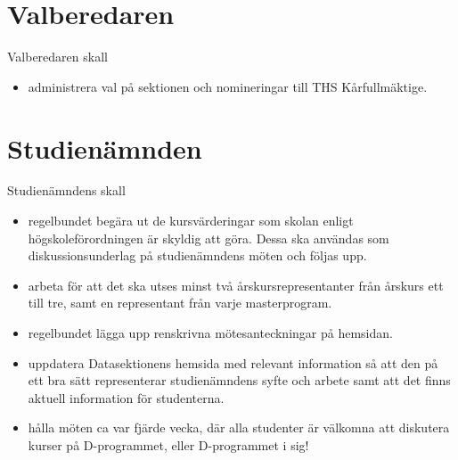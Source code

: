 \documentclass{dgovdoc}
\begin{document}
\section{Valberedaren}

Valberedaren skall

\begin{itemize}
\item administrera val på sektionen och nomineringar till THS Kårfullmäktige.
\end{itemize}

\section{Studienämnden}

Studienämndens skall

\begin{itemize}
\item regelbundet begära ut de kursvärderingar som skolan enligt
  högskoleförordningen är skyldig att göra. Dessa ska användas som
  diskussionsunderlag på studienämndens möten och följas upp.
\item arbeta för att det ska utses minst två årskursrepresentanter från årskurs
  ett till tre, samt en representant från varje masterprogram.
\item regelbundet lägga upp renskrivna mötesanteckningar på hemsidan.
\item uppdatera Datasektionens hemsida med relevant information så att den på
  ett bra sätt representerar studienämndens syfte och arbete samt att det finns
  aktuell information för studenterna.
\item hålla möten ca var fjärde vecka, där alla studenter är välkomna att
  diskutera kurser på D-programmet, eller D-programmet i sig!
\end{itemize}
\end{document}
